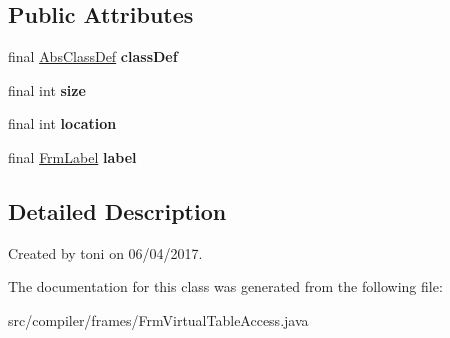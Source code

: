 \subsection*{Public Attributes}
\begin{DoxyCompactItemize}
\item 
\mbox{\label{classcompiler_1_1frames_1_1_frm_virtual_table_access_ae4e8aba3644aaf9c6c04e876d02865cb}} 
final \hyperlink{classcompiler_1_1abstr_1_1tree_1_1def_1_1_abs_class_def}{Abs\+Class\+Def} {\bfseries class\+Def}
\item 
\mbox{\label{classcompiler_1_1frames_1_1_frm_virtual_table_access_aad3a7e3a929b8644377ceb7a072e5bb4}} 
final int {\bfseries size}
\item 
\mbox{\label{classcompiler_1_1frames_1_1_frm_virtual_table_access_a1db6b94d22c81681e2499148ee5595f2}} 
final int {\bfseries location}
\item 
\mbox{\label{classcompiler_1_1frames_1_1_frm_virtual_table_access_a0a2e8e83a1496ec03443c25d45bcadb0}} 
final \hyperlink{classcompiler_1_1frames_1_1_frm_label}{Frm\+Label} {\bfseries label}
\end{DoxyCompactItemize}


\subsection{Detailed Description}
Created by toni on 06/04/2017. 

The documentation for this class was generated from the following file\+:\begin{DoxyCompactItemize}
\item 
src/compiler/frames/Frm\+Virtual\+Table\+Access.\+java\end{DoxyCompactItemize}
